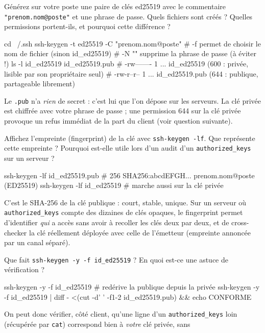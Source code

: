 \documentclass[a4paper,10pt]{exam}
\begin{document}
\begin{questions}
\question Générez sur votre poste une paire de clés ed25519 avec le commentaire
\texttt{"prenom.nom@poste"} et une phrase de passe. Quels fichiers sont créés ?
Quelles permissions portent-ils, et pourquoi cette différence ?
\begin{solution}
\begin{bashcode}
cd ~/.ssh
ssh-keygen -t ed25519 -C "prenom.nom@poste"
# -f permet de choisir le nom de fichier (sinon id_ed25519)
# -N "" supprime la phrase de passe (à éviter !)
ls -l id_ed25519 id_ed25519.pub
# -rw------- 1 ... id_ed25519      (600 : privée, lisible par son propriétaire seul)
# -rw-r--r-- 1 ... id_ed25519.pub  (644 : publique, partageable librement)
\end{bashcode}
Le \texttt{.pub} n'a \emph{rien} de secret : c'est lui que l'on dépose sur les serveurs.
La clé privée est chiffrée avec votre phrase de passe ; une permission 644 sur la clé privée
provoque un refus immédiat de la part du client (voir question suivante).
\end{solution}
\question Affichez l'empreinte (fingerprint) de la clé avec \texttt{ssh-keygen -lf}.
Que représente cette empreinte ? Pourquoi est-elle utile lors d'un audit d'un
\texttt{authorized\_keys} sur un serveur ?
\begin{solution}
\begin{bashcode}
ssh-keygen -lf id_ed25519.pub
# 256 SHA256:abcdEFGH... prenom.nom@poste (ED25519)
ssh-keygen -lf id_ed25519     # marche aussi sur la clé privée
\end{bashcode}
C'est le SHA-256 de la clé publique : court, stable, unique. Sur un serveur où
\texttt{authorized\_keys} compte des dizaines de clés opaques, le fingerprint permet
d'identifier \emph{qui} a accès sans avoir à recoller les clés deux par deux, et de
cross-checker la clé réellement déployée avec celle de l'émetteur (empreinte annoncée
par un canal séparé).
\end{solution}
\question Que fait \texttt{ssh-keygen -y -f id\_ed25519} ? En quoi est-ce une astuce
de vérification ?
\begin{solution}
\begin{bashcode}
ssh-keygen -y -f id_ed25519        # redérive la publique depuis la privée
ssh-keygen -y -f id_ed25519 | diff - <(cut -d' ' -f1-2 id_ed25519.pub) && echo CONFORME
\end{bashcode}
On peut donc vérifier, côté client, qu'une ligne d'un \texttt{authorized\_keys}
loin (récupérée par \texttt{cat}) correspond bien à \emph{votre} clé privée, sans

\end{solution}
\end{questions}
\end{document}
